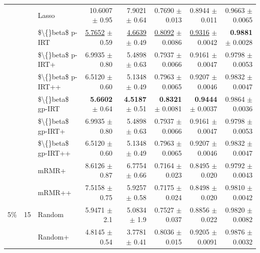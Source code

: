 \begin{longtable}{llp{}rrrrr}
 &  & Lasso & 10.6007 {\scriptsize $\pm$ 0.95} & 7.9021 {\scriptsize $\pm$ 0.64} & 0.7690 {\scriptsize $\pm$ 0.013} & 0.8944 {\scriptsize $\pm$ 0.011} & 0.9663 {\scriptsize $\pm$ 0.0065} \\
 &  & \$\textbackslash\{\}beta\$ p-IRT & \underline{5.7652} {\scriptsize $\pm$ 0.59} & \underline{4.6639} {\scriptsize $\pm$ 0.49} & \underline{0.8092} {\scriptsize $\pm$ 0.0086} & \underline{0.9316} {\scriptsize $\pm$ 0.0042} & \textbf{0.9881} {\scriptsize $\pm$ 0.0028} \\
 &  & \$\textbackslash\{\}beta\$ p-IRT+ & 6.9935 {\scriptsize $\pm$ 0.80} & 5.4898 {\scriptsize $\pm$ 0.63} & 0.7937 {\scriptsize $\pm$ 0.0066} & 0.9161 {\scriptsize $\pm$ 0.0047} & 0.9798 {\scriptsize $\pm$ 0.0053} \\
 &  & \$\textbackslash\{\}beta\$ p-IRT++ & 6.5120 {\scriptsize $\pm$ 0.60} & 5.1348 {\scriptsize $\pm$ 0.49} & 0.7963 {\scriptsize $\pm$ 0.0065} & 0.9207 {\scriptsize $\pm$ 0.0046} & 0.9832 {\scriptsize $\pm$ 0.0047} \\
 &  & \$\textbackslash\{\}beta\$ gp-IRT & \textbf{5.6602} {\scriptsize $\pm$ 0.64} & \textbf{4.5187} {\scriptsize $\pm$ 0.51} & \textbf{0.8321} {\scriptsize $\pm$ 0.0081} & \textbf{0.9444} {\scriptsize $\pm$ 0.0037} & 0.9864 {\scriptsize $\pm$ 0.0036} \\
 &  & \$\textbackslash\{\}beta\$ gp-IRT+ & 6.9935 {\scriptsize $\pm$ 0.80} & 5.4898 {\scriptsize $\pm$ 0.63} & 0.7937 {\scriptsize $\pm$ 0.0066} & 0.9161 {\scriptsize $\pm$ 0.0047} & 0.9798 {\scriptsize $\pm$ 0.0053} \\
 &  & \$\textbackslash\{\}beta\$ gp-IRT++ & 6.5120 {\scriptsize $\pm$ 0.60} & 5.1348 {\scriptsize $\pm$ 0.49} & 0.7963 {\scriptsize $\pm$ 0.0065} & 0.9207 {\scriptsize $\pm$ 0.0046} & 0.9832 {\scriptsize $\pm$ 0.0047} \\
 &  & mRMR+ & 8.6126 {\scriptsize $\pm$ 0.87} & 6.7754 {\scriptsize $\pm$ 0.66} & 0.7164 {\scriptsize $\pm$ 0.023} & 0.8495 {\scriptsize $\pm$ 0.020} & 0.9792 {\scriptsize $\pm$ 0.0043} \\
 &  & mRMR++ & 7.5158 {\scriptsize $\pm$ 0.75} & 5.9257 {\scriptsize $\pm$ 0.58} & 0.7175 {\scriptsize $\pm$ 0.024} & 0.8498 {\scriptsize $\pm$ 0.020} & 0.9810 {\scriptsize $\pm$ 0.0042} \\
\midrule
5\% & 15 & Random & 5.9471 {\scriptsize $\pm$ 2.1} & 5.0834 {\scriptsize $\pm$ 1.9} & 0.7527 {\scriptsize $\pm$ 0.037} & 0.8856 {\scriptsize $\pm$ 0.022} & 0.9820 {\scriptsize $\pm$ 0.0082} \\
 &  & Random+ & 4.8145 {\scriptsize $\pm$ 0.54} & 3.7781 {\scriptsize $\pm$ 0.41} & 0.8036 {\scriptsize $\pm$ 0.015} & 0.9205 {\scriptsize $\pm$ 0.0091} & 0.9876 {\scriptsize $\pm$ 0.0032} \\

\end{longtable}
